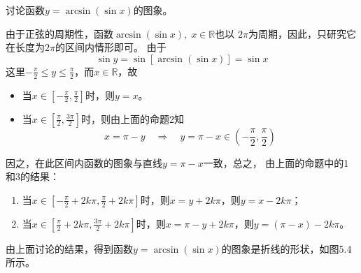 \begin{example}
    讨论函数$y=\arcsin(\sin x)$的图象。
\end{example}

\begin{solution}
    由于正弦的周期性，函数$\arcsin(\sin x),\; x\in\mathbb{R}$也以
$2\pi$为周期，因此，只研究它在长度为$2\pi$的区间内情形即可。
由于
\[\sin y=\sin[\arcsin(\sin x)]=\sin x\]
这里$-\frac{\pi}{2}\le y\le \frac{\pi}{2}$，而$x\in\mathbb{R}$，故
\begin{itemize}
    \item 当$x\in\left[-\frac{\pi}{2},\frac{\pi}{2}\right]$时，则$y=x$。
    \item 当$x\in\left[\frac{\pi}{2},\frac{3\pi}{2}\right]$时，则由上面的命题2知
    \[x=\pi-y\quad \Rightarrow\quad y=\pi-x\in \left(-\frac{\pi}{2},\frac{\pi}{2}\right)\]
\end{itemize}
因之，在此区间内函数的图象与直线$y=\pi-x$一致，总之，
由上面的命题中的1和3的结果：
\begin{enumerate}
    \item 当$x\in \left[-\frac{\pi}{2}+2k\pi,\frac{\pi}{2}+2k\pi\right]$时，则$x=y+2k\pi$，则$y=x-2k\pi$；
    \item 当$x\in \left[\frac{\pi}{2}+2k\pi,\frac{3\pi}{2}+2k\pi\right]$时，则$x=\pi-y+2k\pi$，则$y=(\pi-x)-2k\pi$。
\end{enumerate}
由上面讨论的结果，得到函数$y= \arcsin
(\sin x)$的图象是折线的形状，如图5.4所示。
\begin{figure}[htp]
    \centering
{}
    \caption{}
\end{figure}
\end{solution}




